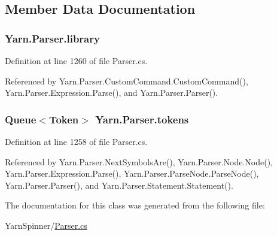 \subsection{Member Data Documentation}
\hypertarget{a00149_a1313951b09177a1c83b6cf035139197a}{
\subsubsection[{library}]{ Yarn.\-Parser.\-library\hspace{0.3cm}{\ttfamily [private]}}}\label{a00149_a1313951b09177a1c83b6cf035139197a}


Definition at line 1260 of file Parser.\-cs.



Referenced by Yarn.\-Parser.\-Custom\-Command.\-Custom\-Command(), Yarn.\-Parser.\-Expression.\-Parse(), and Yarn.\-Parser.\-Parser().

\hypertarget{a00149_a1a4de646937057988b59d2ff8035eae3}{
\subsubsection[{tokens}]{\setlength{\rightskip}{0pt plus 5cm}Queue$<${\bf Token}$>$ Yarn.\-Parser.\-tokens\hspace{0.3cm}{\ttfamily [private]}}}\label{a00149_a1a4de646937057988b59d2ff8035eae3}


Definition at line 1258 of file Parser.\-cs.



Referenced by Yarn.\-Parser.\-Next\-Symbols\-Are(), Yarn.\-Parser.\-Node.\-Node(), Yarn.\-Parser.\-Expression.\-Parse(), Yarn.\-Parser.\-Parse\-Node.\-Parse\-Node(), Yarn.\-Parser.\-Parser(), and Yarn.\-Parser.\-Statement.\-Statement().



The documentation for this class was generated from the following file\-:\begin{DoxyCompactItemize}
\item 
Yarn\-Spinner/\hyperlink{a00313}{Parser.\-cs}\end{DoxyCompactItemize}

